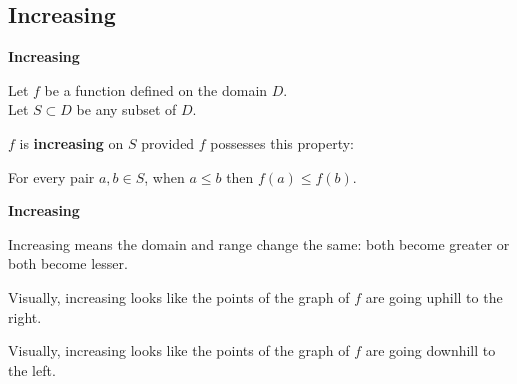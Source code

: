 \documentclass{ximera}
\begin{document}
\subsection*{Increasing}



\begin{definition} \textbf{\textcolor{green!50!black}{Increasing}} 


Let $f$ be a function defined on the domain $D$. \\
Let $S \subset D$ be any subset of $D$.

$f$ is \textbf{increasing} on $S$ provided $f$ possesses this property:  


\begin{center}
For every pair $a, b \in S$, when $a \leq b$ then $f(a) \leq f(b)$.
\end{center}

\end{definition}




\begin{idea} \textbf{\textcolor{blue!55!black}{Increasing}}

Increasing means the domain and range change the same: both become greater or both become lesser.
\end{idea}



\begin{observation}
Visually, increasing looks like the points of the graph of $f$ are going uphill to the right.
\end{observation}


\begin{observation}
Visually, increasing looks like the points of the graph of $f$ are going downhill to the left.
\end{observation}
\end{document}
